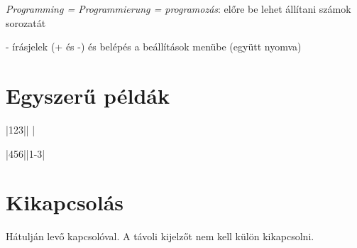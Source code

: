 \documentclass{article}
\begin{document}
 \emph{Programming = Programmierung = programozás}: előre be lehet állítani számok sorozatát

\keys{{+}}-\keys{{-}} írásjelek (+ és -) és belépés a beállítások menübe (együtt nyomva)

\section*{Egyszerű példák}

   \keys{ } \dotfill {}|123||   |

     \keys{-}  \keys{ } \dotfill {}|456||1-3|

\section*{Kikapcsolás}

Hátulján levő kapcsolóval. A távoli kijelzőt nem kell külön kikapcsolni.


\end{document}

